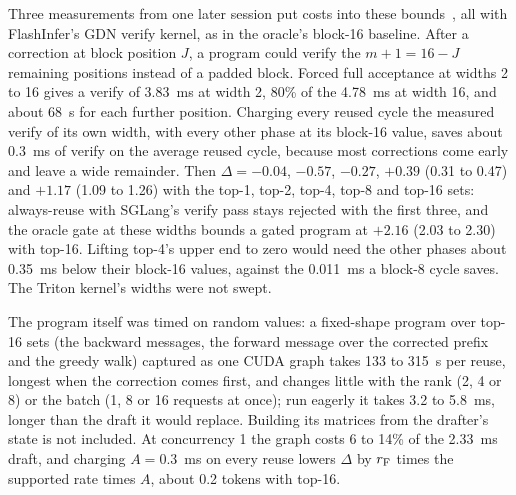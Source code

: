 Three measurements from one later session put costs into these bounds~, all with FlashInfer's GDN verify kernel, as in the oracle's block-16 baseline. After a correction at block position $J$, a program could verify the $m+1=16-J$ remaining positions instead of a padded block. Forced full acceptance at widths 2 to 16 gives a verify of 3.83~ms at width 2, 80\% of the 4.78~ms at width 16, and about 68~\textmu s for each further position. Charging every reused cycle the measured verify of its own width, with every other phase at its block-16 value, saves about 0.3~ms of verify on the average reused cycle, because most corrections come early and leave a wide remainder. Then $\Delta=-0.04$, $-0.57$, $-0.27$, $+0.39$ (0.31 to 0.47) and $+1.17$ (1.09 to 1.26) with the top-1, top-2, top-4, top-8 and top-16 sets: always-reuse with SGLang's verify pass stays rejected with the first three, and the oracle gate at these widths bounds a gated program at $+2.16$ (2.03 to 2.30) with top-16. Lifting top-4's upper end to zero would need the other phases about 0.35~ms below their block-16 values, against the 0.011~ms a block-8 cycle saves. The Triton kernel's widths were not swept.

The program itself was timed on random values: a fixed-shape program over top-16 sets (the backward messages, the forward message over the corrected prefix and the greedy walk) captured as one CUDA graph takes 133 to 315~\textmu s per reuse, longest when the correction comes first, and changes little with the rank (2, 4 or 8) or the batch (1, 8 or 16 requests at once); run eagerly it takes 3.2 to 5.8~ms, longer than the draft it would replace. Building its matrices from the drafter's state is not included. At concurrency 1 the graph costs 6 to 14\% of the 2.33~ms draft, and charging $A=0.3$~ms on every reuse lowers $\Delta$ by $r_{\rm F}$ times the supported rate times $A$, about 0.2 tokens with top-16.

